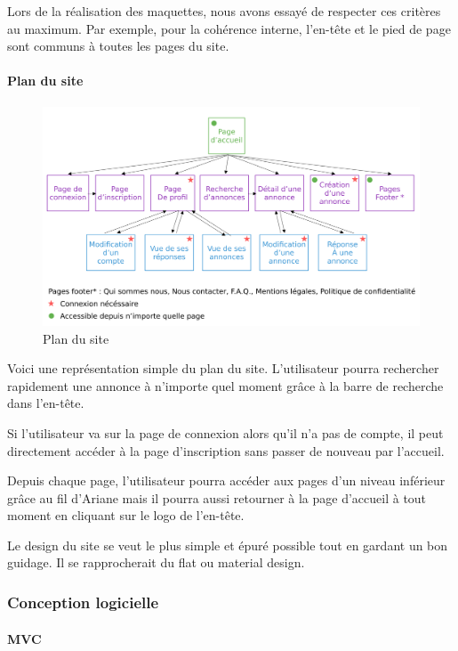 \documentclass[a4paper,11pt]{article}
\begin{document}
Lors de la réalisation des maquettes, nous avons essayé de respecter ces critères au maximum.
Par exemple, pour la cohérence interne, l’en-tête et le pied de page sont communs à toutes les pages du site.

\paragraph{Plan du site}

\begin{figure}[H]
  \includegraphics[width=\linewidth]{images/plan-du-site.png}
  \caption{Plan du site}
  \label{fig:plan-du-site}
\end{figure}

Voici une représentation simple du plan du site. L'utilisateur pourra rechercher rapidement une annonce
à n'importe quel moment grâce à la barre de recherche dans l'en-tête.

Si l'utilisateur va sur la page de connexion alors qu'il n'a pas de compte, il peut directement
accéder à la page d'inscription sans passer de nouveau par l'accueil.

Depuis chaque page, l'utilisateur pourra accéder aux pages d'un niveau inférieur grâce au fil d'Ariane
mais il pourra aussi retourner à la page d'accueil à tout moment en cliquant sur le logo de l'en-tête.

Le design du site se veut le plus simple et épuré possible tout en gardant un bon guidage. Il se
rapprocherait du flat ou material design.

\pagebreak

\subsubsection{Conception logicielle}
\paragraph{MVC}\mbox{} \\
\end{document}
